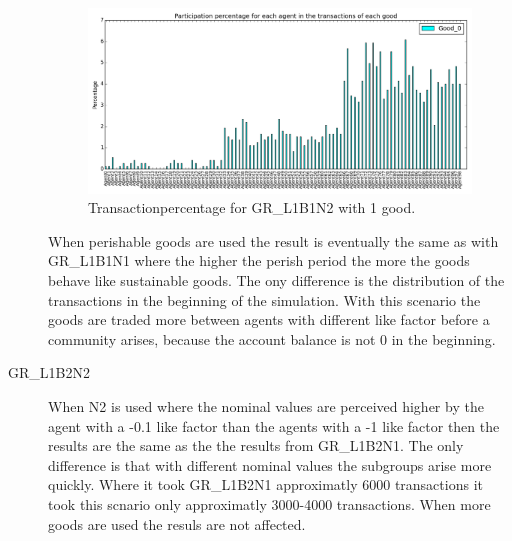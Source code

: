 \documentclass[twoside,openright]{uva-bachelor-thesis}
\begin{document}
\begin{description}
\begin{figure}[h!]
  \centering
\includegraphics[scale=0.4]{Simulation2_figures/GR_L1B2N1_1good_5k} 
  \caption{Transactionpercentage for GR\_L1B1N2 with 1 good.}
\end{figure}


When perishable goods are used the result is eventually the same as with GR\_L1B1N1 where the higher the perish period the more the goods behave like sustainable goods. The ony difference is the distribution of the transactions in the beginning of the simulation. With this scenario the goods are traded more between agents with different like factor before a community arises, because the account balance is not 0 in the beginning. 

\item[GR\_L1B2N2] When N2 is used where the nominal values are perceived higher by the agent with a -0.1 like factor than the agents with a -1 like factor then the results are the same as the the results from GR\_L1B2N1. The only difference is that with different nominal values the subgroups arise more quickly. Where it took GR\_L1B2N1 approximatly 6000 transactions it took this scnario only approximatly 3000-4000 transactions. When more goods are used the resuls are not affected.


\end{description}
\end{document}
